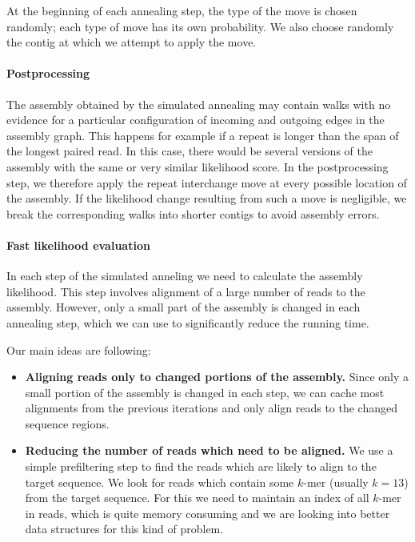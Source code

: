 At the beginning of each annealing step, the type of the move is
chosen randomly; each type of move has its own probability. We also
choose randomly the contig at which we attempt to apply the move. 


\paragraph{Postprocessing}
The assembly obtained by the simulated annealing may contain walks
with no evidence for a particular configuration of incoming and
outgoing edges in the assembly graph. This happens for example if a
repeat is longer than the span of the longest paired read. In this
case, there would be several versions of the assembly with the same or
very similar likelihood score. 
In the postprocessing step, we therefore apply the repeat
interchange move at every possible location of the assembly. If the
likelihood change resulting from such a move is negligible, 
we break the corresponding walks into shorter contigs
to avoid assembly errors. 

\paragraph{Fast likelihood evaluation}
In each step of the simulated anneling we need to calculate
the assembly likelihood. This step involves
alignment of a large number of reads to the assembly.
However, only a small part of the assembly is changed in each
annealing step, which we can use to significantly reduce the running time.

Our main ideas are following:
\begin{itemize}
\item {\bf Aligning reads only to changed portions of the assembly.}
Since only a small portion of the assembly is changed in each step, 
we can cache most alignments from the previous iterations and only 
align reads to the changed sequence regions.
\item {\bf Reducing the number of reads which need to be aligned.}
We use a simple prefiltering step to
find the reads which are likely to align to the target sequence. 
We look for reads which 
contain some $k$-mer (usually $k=13$) from the target sequence.
For this we need to maintain an index of all $k$-mer in reads, which is
quite memory consuming and we are looking into better data structures for this kind
of problem.
\end{itemize}

